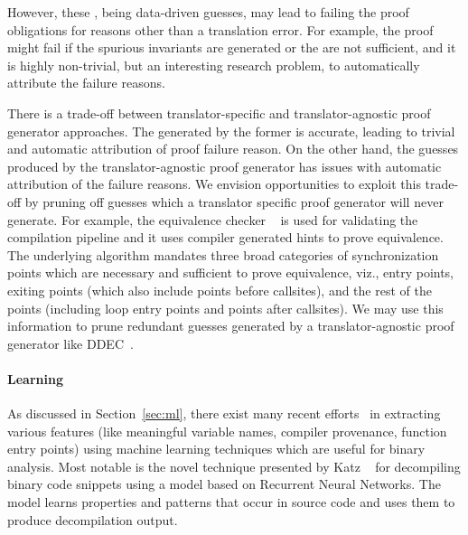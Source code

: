 However, these \syncp, being
data-driven guesses, may lead to failing the proof obligations for reasons
other than a translation error. For example, the proof might fail if the
spurious invariants are generated or the \syncps are not sufficient, and it is
highly non-trivial, but an interesting research problem, to automatically
attribute the failure reasons. 

There is a trade-off between translator-specific and translator-agnostic proof
generator approaches. The \syncps generated by the former is accurate, leading
to trivial and automatic attribution of proof failure reason. On the other
hand, the \syncp guesses produced by the  translator-agnostic proof generator
has issues with automatic attribution  of the failure reasons. We envision
opportunities to exploit this trade-off by pruning off \syncp  guesses which a
translator specific proof generator will never generate. For
  example, the equivalence checker ~\cite{TheoSAS19} is used for
    validating the compilation pipeline and it uses compiler generated hints to
    prove equivalence. The underlying algorithm mandates three
broad categories of synchronization points which are necessary and sufficient
to prove equivalence, viz., entry points, exiting points (which also include
    points before callsites), and the rest of the points (including loop entry
      points and points after callsites). We may use this information to prune
    redundant \syncp guesses generated by a translator-agnostic  proof
    generator like DDEC~\cite{DDEC:OOPSLA:2013}.

\paragraph{\textbf{Learning \syncps}}

As discussed in Section~\ref{sec:ml}, there exist many recent
efforts~\cite{Jaffe:2018ICPC,Rosenblum2007,Rosenblum:2008,Rosenblum:2010,Rosenblum:2011,Bao:2014,Shin:2015}
in extracting various features (like meaningful variable names, compiler
    provenance, function entry points) using machine learning techniques which
are useful for binary analysis. Most notable is the novel technique presented
by Katz \etal~\cite{katz2018rnn}  for decompiling binary code snippets using a
model based on Recurrent Neural Networks. The model learns properties and
patterns that occur in source code and uses them to produce decompilation
output. 
%

